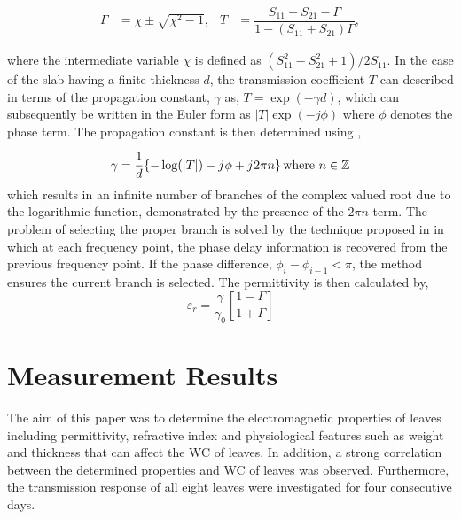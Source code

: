 \documentclass[journal,article,submit,moreauthors,pdftex]{Definitions/mdpi}
\renewcommand{\^}{\hat}  %
\renewcommand{\j}{{j}\mkern1mu} %
\begin{document}
%
\begin{align}
	\Gamma & = \chi \pm \sqrt{\chi^2 - 1}, & T & = \dfrac{S_{11} + S_{21} - \Gamma}{1 - \left( S_{11} + S_{21}\right) \Gamma}, 
	\label{eq:ref_tran_coefficients}
\end{align}

where the intermediate variable $\chi$ is defined as $\left(S_{11}^2 - S_{21}^2 + 1\right)/{2 S_{11}}$. In the case of the slab having a finite thickness $d$, the transmission coefficient $T$ can described in terms of the propagation constant, $\gamma$ as, $T = \exp( - \gamma d)$,  which can subsequently be written in the Euler form as $|T| \exp(-j \phi)$ where $\phi$ denotes the phase term. The propagation constant is then determined using \cite{costa_electromagnetic_2017},
%

\begin{equation}
	\gamma = \frac{1}{d} \{ - \log(|T|) - \j \phi + \j 2 \pi n \} \, \mathrm{where}~ n \in \mathbb{Z}
	\label{eq:roots}
\end{equation}
%
which results in an infinite number of branches of the complex valued root due to the logarithmic function, demonstrated by the presence of the $2 \pi n$ term. The problem of selecting the proper branch is solved by the technique proposed in \cite{Luukkonen2011} in which at each frequency point, the phase delay information is recovered from the previous frequency point. If the phase difference, $\phi_i - \phi_{i-1} < \pi$, the method ensures the current branch is selected. The permittivity is then calculated by,
%
\begin{equation}
	\varepsilon_r = \frac{\gamma}{\gamma_0} \left[ \dfrac{1 - \Gamma}{1 + \Gamma} \right]
	\label{eq:permittivity}
\end{equation}
%
\section{Measurement Results}
\label{sec:results}

%
The aim of this paper was to determine the electromagnetic properties of leaves including permittivity, refractive index and physiological features such as weight and thickness that can affect the WC of leaves.  In addition, a strong correlation between the determined properties and WC of leaves was observed. Furthermore, the transmission response of all eight leaves were investigated for four consecutive days.
\end{document}
